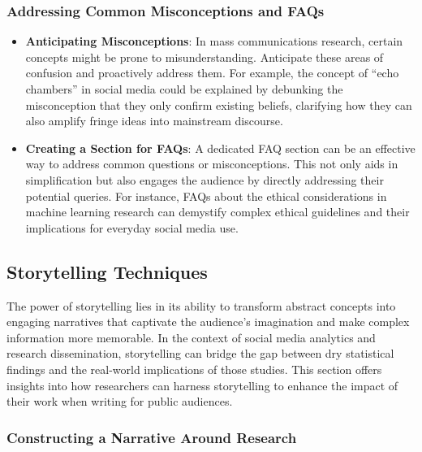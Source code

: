 \documentclass[
]{book}
\begin{document}
\hypertarget{addressing-common-misconceptions-and-faqs}{%
\subsubsection*{Addressing Common Misconceptions and FAQs}\label{addressing-common-misconceptions-and-faqs}}

\begin{itemize}
\item
  \textbf{Anticipating Misconceptions}: In mass communications research, certain concepts might be prone to misunderstanding. Anticipate these areas of confusion and proactively address them. For example, the concept of ``echo chambers'' in social media could be explained by debunking the misconception that they only confirm existing beliefs, clarifying how they can also amplify fringe ideas into mainstream discourse.
\item
  \textbf{Creating a Section for FAQs}: A dedicated FAQ section can be an effective way to address common questions or misconceptions. This not only aids in simplification but also engages the audience by directly addressing their potential queries. For instance, FAQs about the ethical considerations in machine learning research can demystify complex ethical guidelines and their implications for everyday social media use.
\end{itemize}

\hypertarget{storytelling-techniques}{%
\subsection*{Storytelling Techniques}\label{storytelling-techniques}}

The power of storytelling lies in its ability to transform abstract concepts into engaging narratives that captivate the audience's imagination and make complex information more memorable. In the context of social media analytics and research dissemination, storytelling can bridge the gap between dry statistical findings and the real-world implications of those studies. This section offers insights into how researchers can harness storytelling to enhance the impact of their work when writing for public audiences.

\hypertarget{constructing-a-narrative-around-research}{%
\subsubsection*{Constructing a Narrative Around Research}\label{constructing-a-narrative-around-research}}
\end{document}
